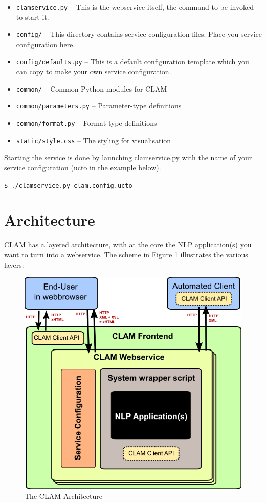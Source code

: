 \documentclass[a4paper,12pt]{report}
\begin{document}
\begin{itemize}
\item \texttt{clamservice.py} -- This is the webservice itself, the command to be invoked to start it.
\item \texttt{config/} -- This directory contains service configuration files. Place you service configuration here.
\item \texttt{config/defaults.py} -- This is a default configuration template which you can copy to make your own service configuration.
\item \texttt{common/} -- Common Python modules for CLAM
\item \texttt{common/parameters.py} -- Parameter-type definitions
\item \texttt{common/format.py} -- Format-type definitions
\item \texttt{static/style.css} -- The styling for visualisation

\end{itemize}

Starting the service is done by launching clamservice.py with the name of your service configuration (ucto in the example below).

\texttt{\$ ./clamservice.py clam.config.ucto}

\section{Architecture}

CLAM has a layered architecture, with at the core the NLP application(s) you want to turn into a webservice. The scheme in Figure \ref{fig:arch} illustrates the various layers: 

\begin{figure}[h]
\begin{center}
\includegraphics[width=130.0mm]{architecture.png}
\end{center}
\caption{The CLAM Architecture}
\label{fig:arch} 
\end{figure}
\end{document}

